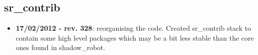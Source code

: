 
\subsection{sr\_contrib}
\label{sec:sr-contrib-changelog}

\begin{itemize}
\item \textbf{17/02/2012 - rev. 328}: reorganising the code. Created sr\_contrib stack to contain some high level packages which may be a bit less stable than the core ones found in shadow\_robot.
\end{itemize}